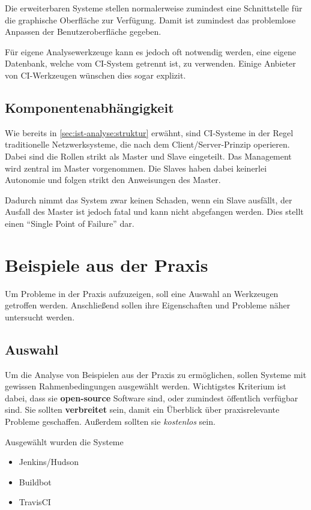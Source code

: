 Die erweiterbaren Systeme stellen normalerweise zumindest eine Schnittstelle
für die graphische Oberfläche zur Verfügung.
Damit ist zumindest das problemlose Anpassen der Benutzeroberfläche gegeben.


Für eigene Analysewerkzeuge kann es jedoch oft notwendig werden,
eine eigene Datenbank, welche vom \ac{CI}-System getrennt ist, zu verwenden.
Einige Anbieter von \ac{CI}-Werkzeugen wünschen dies sogar explizit.


\subsection{Komponentenabhängigkeit}

Wie bereits in \cref{sec:ist-analyse:struktur} erw\"ahnt,
sind \ac{CI}-Systeme in der Regel traditionelle Netzwerksysteme,
die nach dem Client/Server-Prinzip operieren.
Dabei sind die Rollen strikt als Master und Slave eingeteilt.
Das Management wird zentral im Master vorgenommen.
Die Slaves haben dabei keinerlei Autonomie
und folgen strikt den Anweisungen des Master.

Dadurch nimmt das System zwar keinen Schaden, wenn ein Slave ausfällt,
der Ausfall des Master ist jedoch fatal und kann nicht abgefangen werden.
Dies stellt einen ``Single Point of Failure'' dar.


\section{Beispiele aus der Praxis}

Um Probleme in der Praxis aufzuzeigen,
soll eine Auswahl an Werkzeugen getroffen werden.
Anschließend sollen ihre Eigenschaften und Probleme
näher untersucht werden.


\subsection{Auswahl}

Um die Analyse von Beispielen aus der Praxis zu ermöglichen,
sollen Systeme mit gewissen Rahmenbedingungen ausgew\"ahlt werden.
Wichtigstes Kriterium ist dabei, dass sie \textbf{open-source} Software sind,
oder zumindest öffentlich verfügbar sind.
Sie sollten \textbf{verbreitet} sein, damit ein Überblick
über praxisrelevante Probleme geschaffen.
Außerdem sollten sie \textit{kostenlos} sein. %

Ausgewählt wurden die Systeme
\begin{itemize}
  \item Jenkins/Hudson
  \item Buildbot
  \item TravisCI
\end{itemize}

